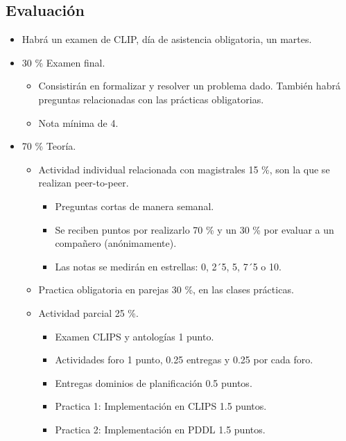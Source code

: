 \documentclass[12pt, twoside, openright]{report} %
\begin{document}
\subsection{Evaluación}
\begin{itemize}
	\item Habrá un examen de CLIP, día de asistencia obligatoria, un martes.
	\item 30 \% Examen final.
	      \begin{itemize}
		      \item Consistirán en formalizar y resolver un problema dado. También habrá preguntas relacionadas con las prácticas obligatorias.
		      \item Nota mínima de 4.
	      \end{itemize}
	\item 70 \% Teoría.
	      \begin{itemize}
		      \item Actividad individual relacionada con magistrales 15 \%, son la que se realizan peer-to-peer.
		            \begin{itemize}
			            \item Preguntas cortas de manera semanal.
			            \item Se reciben puntos por realizarlo 70 \% y un 30 \% por evaluar a un compañero (anónimamente).
			            \item Las notas se medirán en estrellas: 0, 2´5, 5, 7´5 o 10.
		            \end{itemize}
		      \item Practica obligatoria en parejas 30 \%, en las clases prácticas.
		      \item Actividad parcial 25 \%.
		            \begin{itemize}
			            \item Examen CLIPS y antologías 1 punto.
			            \item Actividades foro 1 punto, 0.25 entregas  y 0.25 por cada foro.
			            \item Entregas dominios de planificación 0.5 puntos.
			            \item Practica 1: Implementación en CLIPS 1.5 puntos.
			            \item Practica 2: Implementación en PDDL 1.5 puntos.
		            \end{itemize}
	      \end{itemize}
\end{itemize}
\end{document}
